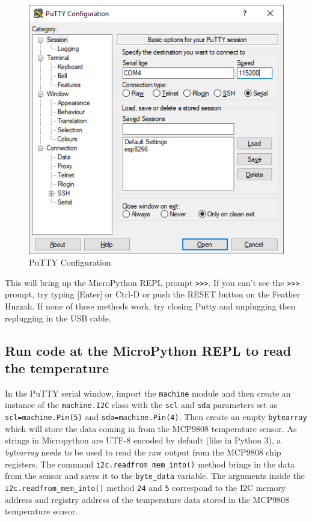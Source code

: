\documentclass{book}
\makeatletter
\def\maxwidth{\ifdim\Gin@nat@width>\linewidth\linewidth
    \else\Gin@nat@width\fi}
\let\Oldincludegraphics\includegraphics
\renewcommand{\includegraphics}[1]{\Oldincludegraphics[width=.8\maxwidth]{#1}}
\makeatother
\begin{document}
\begin{figure}
\centering
\includegraphics{images/putty_config.PNG}
\caption{PuTTY Configuration}
\end{figure}

This will bring up the MicroPython REPL prompt \lstinline!>>>!. If you
can't see the \lstinline!>>>! prompt, try typing {[}Enter{]} or Ctrl-D
or push the RESET button on the Feather Huzzah. If none of these methods
work, try closing Putty and unplugging then replugging in the USB cable.

    \subsection{Run code at the MicroPython REPL to read the
temperature}\label{run-code-at-the-micropython-repl-to-read-the-temperature}

    In the PuTTY serial window, import the \lstinline!machine! module and
then create an instance of the \lstinline!machine.I2C! class with the
\lstinline!scl! and \lstinline!sda! parameters set as
\lstinline!scl=machine.Pin(5)! and \lstinline!sda=machine.Pin(4)!. Then
create an empty \lstinline!bytearray! which will store the data coming
in from the MCP9808 temperature sensor. As strings in Micropython are
UTF-8 encoded by default (like in Python 3), a \emph{bytearray} needs to
be used to read the raw output from the MCP9808 chip registers. The
command \lstinline!i2c.readfrom_mem_into()! method brings in the data
from the sensor and saves it to the \lstinline!byte_data! variable. The
arguments inside the \lstinline!i2c.readfrom_mem_into()! method
\lstinline!24! and \lstinline!5! correspond to the I2C memory address
and registry address of the temperature data stored in the MCP9808
temperature sensor.
\end{document}
